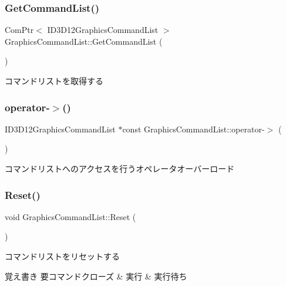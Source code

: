 \subsubsection{\texorpdfstring{Get\+Command\+List()}{GetCommandList()}}
{\footnotesize\ttfamily Com\+Ptr$<$ I\+D3\+D12\+Graphics\+Command\+List $>$ Graphics\+Command\+List\+::\+Get\+Command\+List (\begin{DoxyParamCaption}{ }\end{DoxyParamCaption})}



コマンドリストを取得する 

\mbox{\label{class_graphics_command_list_aa62a89b6eeaa4e4fd7bc32d97a2d7ab3}} 
\subsubsection{\texorpdfstring{operator-\/$>$()}{operator->()}}
{\footnotesize\ttfamily I\+D3\+D12\+Graphics\+Command\+List $\ast$const Graphics\+Command\+List\+::operator-\/$>$ (\begin{DoxyParamCaption}{ }\end{DoxyParamCaption})}



コマンドリストへのアクセスを行うオペレータオーバーロード 

\mbox{\label{class_graphics_command_list_a3054d5fc9a9e6ed2d24567eb54484a8f}} 
\subsubsection{\texorpdfstring{Reset()}{Reset()}\hspace{0.1cm}{\footnotesize\ttfamily [1/2]}}
{\footnotesize\ttfamily void Graphics\+Command\+List\+::\+Reset (\begin{DoxyParamCaption}{ }\end{DoxyParamCaption})}



コマンドリストをリセットする 

\begin{DoxyNote}{覚え書き}
要コマンドクローズ \& 実行 \& 実行待ち 
\end{DoxyNote}
\mbox{\label{class_graphics_command_list_ae5f24d01a01bc1ffb30ffa9173f85722}} 
